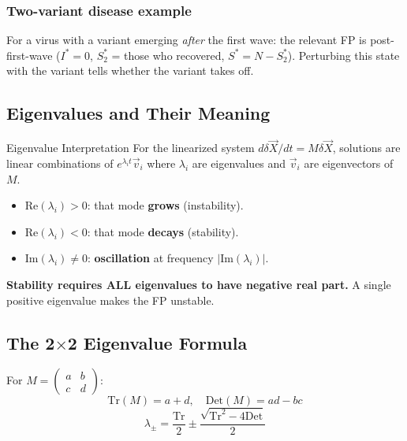 \documentclass[11pt]{article}
\begin{document}
\subsubsection{Two-variant disease example} For a virus with a variant emerging \emph{after} the first wave: the relevant FP is post-first-wave ($I^*=0$, $S_2^*$ = those who recovered, $S^*=N-S_2^*$). Perturbing this state with the variant tells whether the variant takes off.

\subsection{Eigenvalues and Their Meaning}

\begin{conceptbox}{Eigenvalue Interpretation}
For the linearized system $d\delta\vec X/dt = M\delta\vec X$, solutions are linear combinations of $e^{\lambda_i t} \vec v_i$ where $\lambda_i$ are eigenvalues and $\vec v_i$ are eigenvectors of $M$.
\begin{itemize}
\item $\text{Re}(\lambda_i) > 0$: that mode \textbf{grows} (instability).
\item $\text{Re}(\lambda_i) < 0$: that mode \textbf{decays} (stability).
\item $\text{Im}(\lambda_i) \neq 0$: \textbf{oscillation} at frequency $|\text{Im}(\lambda_i)|$.
\end{itemize}

\textbf{Stability requires ALL eigenvalues to have negative real part.} A single positive eigenvalue makes the FP unstable.
\end{conceptbox}

\subsection{The 2$\times$2 Eigenvalue Formula}

For $M = \begin{pmatrix} a & b \\ c & d \end{pmatrix}$:
\[
\text{Tr}(M) = a + d, \quad \text{Det}(M) = ad - bc
\]
\[
\lambda_\pm = \frac{\text{Tr}}{2} \pm \frac{\sqrt{\text{Tr}^2 - 4\text{Det}}}{2}
\]
\end{document}
